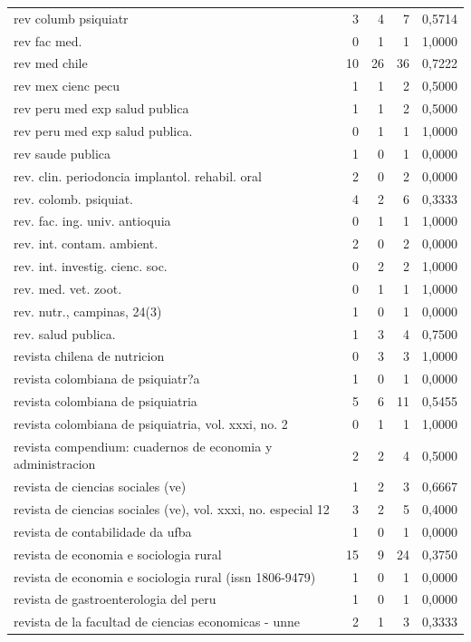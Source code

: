 \begin{longtable}{lrrrr}
rev columb psiquiatr & 3 & 4 & 7 & 0,5714\\
rev fac med. & 0 & 1 & 1 & 1,0000\\
rev med chile & 10 & 26 & 36 & 0,7222\\
rev mex cienc pecu & 1 & 1 & 2 & 0,5000\\
rev peru med exp salud publica & 1 & 1 & 2 & 0,5000\\
rev peru med exp salud publica. & 0 & 1 & 1 & 1,0000\\
rev saude publica & 1 & 0 & 1 & 0,0000\\
rev. clin. periodoncia implantol. rehabil. oral & 2 & 0 & 2 & 0,0000\\
rev. colomb. psiquiat. & 4 & 2 & 6 & 0,3333\\
rev. fac. ing. univ. antioquia & 0 & 1 & 1 & 1,0000\\
rev. int. contam. ambient. & 2 & 0 & 2 & 0,0000\\
rev. int. investig. cienc. soc. & 0 & 2 & 2 & 1,0000\\
rev. med. vet. zoot. & 0 & 1 & 1 & 1,0000\\
rev. nutr., campinas, 24(3) & 1 & 0 & 1 & 0,0000\\
rev. salud publica. & 1 & 3 & 4 & 0,7500\\
revista chilena de nutricion & 0 & 3 & 3 & 1,0000\\
revista colombiana de psiquiatr?a & 1 & 0 & 1 & 0,0000\\
revista colombiana de psiquiatria & 5 & 6 & 11 & 0,5455\\
revista colombiana de psiquiatria, vol. xxxi, no. 2 & 0 & 1 & 1 & 1,0000\\
revista compendium: cuadernos de economia y administracion & 2 & 2 & 4 & 0,5000\\
revista de ciencias sociales (ve) & 1 & 2 & 3 & 0,6667\\
revista de ciencias sociales (ve), vol. xxxi, no. especial 12 & 3 & 2 & 5 & 0,4000\\
revista de contabilidade da ufba & 1 & 0 & 1 & 0,0000\\
revista de economia e sociologia rural & 15 & 9 & 24 & 0,3750\\
revista de economia e sociologia rural (issn 1806-9479) & 1 & 0 & 1 & 0,0000\\
revista de gastroenterologia del peru & 1 & 0 & 1 & 0,0000\\
revista de la facultad de ciencias economicas - unne & 2 & 1 & 3 & 0,3333\\

\end{longtable}
